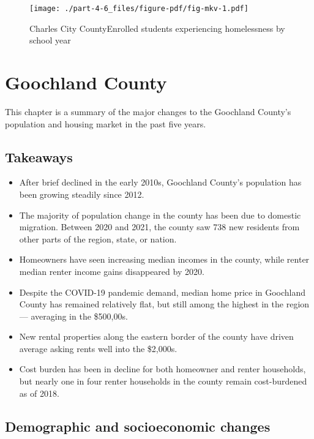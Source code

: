 \documentclass[
  letterpaper,
  DIV=11,
  numbers=noendperiod]{scrreprt}
\providecommand{\tightlist}{%
  \setlength{\itemsep}{0pt}\setlength{\parskip}{0pt}}\usepackage{longtable,booktabs,array}
\begin{document}
\begin{figure}

{\centering \texttt{[image: ./part-4-6\_files/figure-pdf/fig-mkv-1.pdf]}

}

\caption{\label{fig-mkv}Charles City CountyEnrolled students
experiencing homelessness by school year}

\end{figure}

\hypertarget{part-4-7}{%
\chapter{Goochland County}\label{part-4-7}}

This chapter is a summary of the major changes to the Goochland County's
population and housing market in the past five years.

\hypertarget{takeaways-6}{%
\section{Takeaways}\label{takeaways-6}}

\begin{itemize}
\tightlist
\item
  After brief declined in the early 2010s, Goochland County's population
  has been growing steadily since 2012.
\item
  The majority of population change in the county has been due to
  domestic migration. Between 2020 and 2021, the county saw 738 new
  residents from other parts of the region, state, or nation.
\item
  Homeowners have seen increasing median incomes in the county, while
  renter median renter income gains disappeared by 2020.
\item
  Despite the COVID-19 pandemic demand, median home price in Goochland
  County has remained relatively flat, but still among the highest in
  the region --- averaging in the \$500,00s.
\item
  New rental properties along the eastern border of the county have
  driven average asking rents well into the \$2,000s.
\item
  Cost burden has been in decline for both homeowner and renter
  households, but nearly one in four renter households in the county
  remain cost-burdened as of 2018.
\end{itemize}

\hypertarget{demographic-and-socioeconomic-changes-6}{%
\section{Demographic and socioeconomic
changes}\label{demographic-and-socioeconomic-changes-6}}
\end{document}
